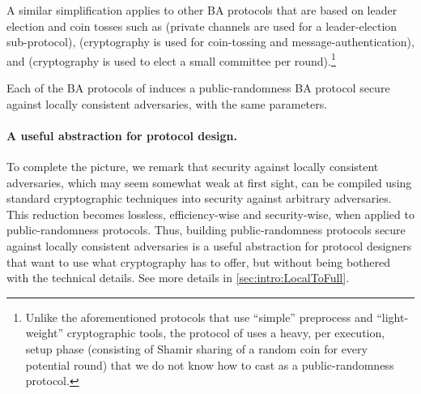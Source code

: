 A similar simplification applies to other BA protocols that are based on leader election and coin tosses such as \cite{FM97,FG03,KK06} (private channels are used for a leader-election sub-protocol), \cite{MV17,ADDNR19} (cryptography is used for coin-tossing and message-authentication), and \cite{SM16,ACDNPRS19} (cryptography is used to elect a small committee per round).\footnote{Unlike the aforementioned protocols that use ``simple'' preprocess and ``light-weight'' cryptographic tools, the protocol of \citet{Rabin83} uses a heavy, per execution, setup phase (consisting of Shamir sharing of a random coin for every potential round) that we do not know how to cast as a public-randomness protocol.}

\begin{proposition}\label{prop:mal_to_local}
Each of the BA protocols of \cite{FM97,FG03,KK06,Micali17,SM16,MV17,ADDNR19,ACDNPRS19} induces a public-randomness BA protocol secure against locally consistent adversaries, with the same parameters.
\end{proposition}


\paragraph{A useful abstraction for protocol design.}
To complete the picture, we remark that security against locally consistent adversaries, which may seem somewhat weak at first sight, can be compiled using standard cryptographic techniques into security against arbitrary adversaries. This reduction becomes lossless, efficiency-wise and security-wise, when applied to public-randomness protocols. Thus, building public-randomness protocols secure against locally consistent adversaries is a useful abstraction for protocol designers that want to use what cryptography has to offer, but without being bothered with the technical details.
See more details in \cref{sec:intro:LocalToFull}.

